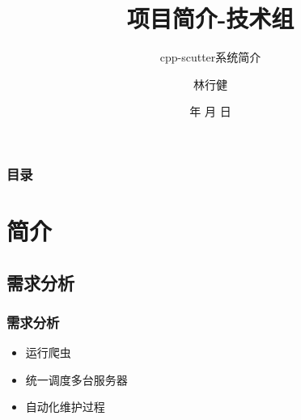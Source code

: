 \documentclass{beamer}
\begin{document}
\title{项目简介-技术组}
\subtitle{cpp-scutter系统简介}

\author{林行健}


\renewcommand{\today}{\number\year 年 \number\month 月 \number\day 日}
\date{\today}

\subject{Presentations}

\begin{frame}
\titlepage
\end{frame}

\begin{frame}[plain]
\frametitle{目录}
\begin{multicols}{2}
\tableofcontents %
\end{multicols}
\end{frame}

\section{简介}
\subsection{需求分析}
\begin{frame}[allowframebreaks]
\frametitle{需求分析}
\begin{itemize}
\item 运行爬虫
\item 统一调度多台服务器
\item 自动化维护过程
\end{itemize}
\framebreak
\end{frame}
\end{document}
